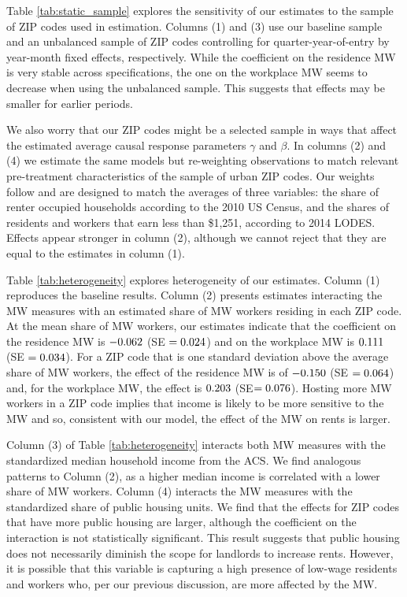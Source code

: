 Table \ref{tab:static_sample} explores the sensitivity of our estimates to 
the sample of ZIP codes used in estimation.
Columns (1) and (3) use our baseline sample and an unbalanced sample of 
ZIP codes controlling for quarter-year-of-entry by year-month fixed effects, 
respectively.
While the coefficient on the residence MW is very stable across specifications,
the one on the workplace MW seems to decrease when using the unbalanced
sample.
This suggests that effects may be smaller for earlier periods.

We also worry that our ZIP codes might be a selected sample in ways that affect
the estimated average causal response parameters $\gamma$ and $\beta$.
In columns (2) and (4) we estimate the same models but re-weighting 
observations to match relevant pre-treatment characteristics of the sample of 
urban ZIP codes.
Our weights follow \textcite{Hainmueller2012} and are designed to match the 
averages of three variables: 
the share of renter occupied households according to the 2010 US Census, and
the shares of residents and workers that earn less than \$1,251, according to
2014 LODES.
Effects appear stronger in column (2), although we cannot reject that they are 
equal to the estimates in column (1).

Table \ref{tab:heterogeneity} explores heterogeneity of our estimates.
Column (1) reproduces the baseline results.
Column (2) presents estimates interacting the MW measures with an estimated 
share of MW workers residing in each ZIP code.
At the mean share of MW workers, our estimates indicate that the coefficient on 
the residence MW is $-0.062$ (SE $=0.024$) and 
on the workplace MW is $0.111$ (SE $=0.034$).
For a ZIP code that is one standard deviation above the average share of MW 
workers, the effect of the residence MW is of $-0.150$ 
(SE $=0.064$) and, for the workplace MW, the effect is
$0.203$ (SE$=0.076$).
Hosting more MW workers in a ZIP code implies that income is likely to be more 
sensitive to the MW and so, consistent with our model, the effect of the MW
on rents is larger.

Column (3) of Table \ref{tab:heterogeneity} interacts both MW measures with the
standardized median household income from the ACS.
We find analogous patterns to Column (2), as a higher median income is 
correlated with a lower share of MW workers.
Column (4) interacts the MW measures with the standardized share of public 
housing units.
We find that the effects for ZIP codes that have more public housing are larger,
although the coefficient on the interaction is not statistically significant. 
This result suggests that public housing does not necessarily diminish the scope 
for landlords to increase rents.
However, it is possible that this variable is capturing a high presence of 
low-wage residents and workers who, per our previous discussion, are more 
affected by the MW.

